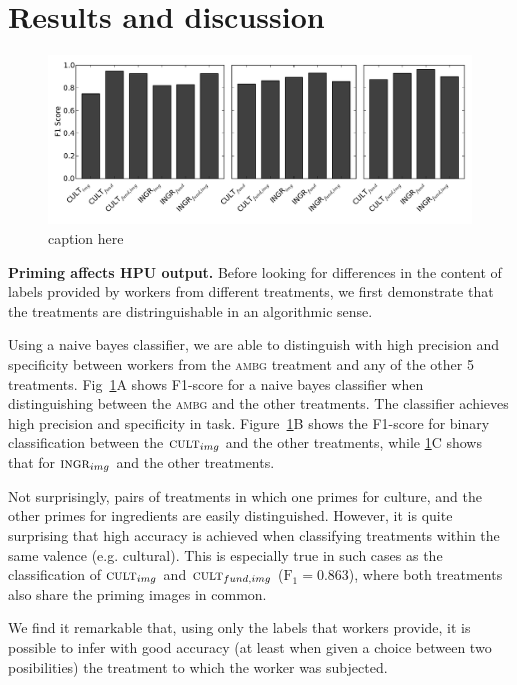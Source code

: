 \documentclass[letterpaper, 11pt, twocolumn]{article}
\begin{document}
\section*{Results and discussion}

\begin{figure}
	\begin{center}
		\includegraphics[scale=0.55]{../figs/f1scores.pdf}
		\caption{caption here}
		\label{fig:classifier}
	\end{center}
\end{figure}

\textbf{Priming affects HPU output.}
Before looking for differences in the content of labels provided by workers
from different treatments, we first demonstrate that the treatments are
distringuishable in an algorithmic sense.

Using a naive bayes classifier, we are able to distinguish with high precision
and specificity between workers from the \textsc{ambg} treatment and any of
the other 5 treatments.  Fig~\ref{fig:classifier}A shows F1-score for a
naive bayes classifier when distinguishing between the \textsc{ambg} and 
the other treatments. The classifier achieves high precision and specificity
in task.  Figure~\ref{fig:classifier}B shows the F1-score for binary
classification between the $\textsc{cult}_{img}$ and the other treatments, 
while \ref{fig:classifier}C shows that for $\textsc{ingr}_{img}$ and the other
treatments.  

Not surprisingly, pairs of treatments in which one primes for culture, and the
other primes for ingredients are easily distinguished.  However, it is quite
surprising that high accuracy is achieved when classifying treatments within 
the same valence (e.g. cultural).  This is especially true in such cases as
the classification of  $\textsc{cult}_{img}$ and $\textsc{cult}_{fund,img}$
($\text{F}_1 = 0.863$), where both treatments also share the priming images in 
common.

We find it remarkable that, using only the labels that workers provide, it is
possible to infer with good accuracy (at least when given a choice between 
two posibilities)  the treatment to which the worker was 
subjected.
\end{document}
